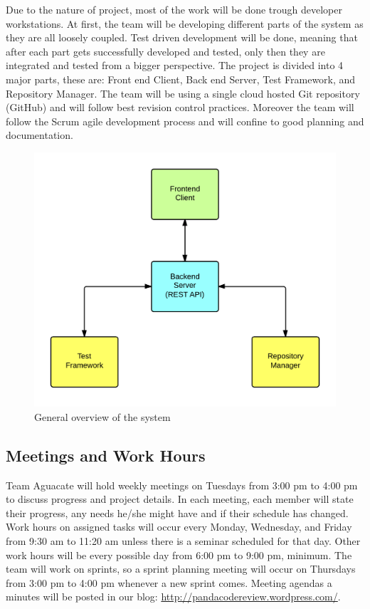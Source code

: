 
Due to the nature of project, most of the work will be done trough developer
workstations. At first, the team will be developing different parts of the
system as they are all loosely coupled. Test driven development will be done,
meaning that after each part gets successfully developed and tested, only then
they are integrated and tested from a bigger perspective. The project is divided
into 4 major parts, these are: Front end Client, Back end Server, Test
Framework, and Repository Manager. The team will be using a single cloud hosted
Git repository (GitHub) and will follow best revision control practices.
Moreover the team will follow the Scrum agile development process and will
confine to good planning and documentation.

\begin{figure}[H]
	\centering
	\includegraphics[width=\textwidth]{img/bigArquitectOverview}
	\caption{General overview of the system}
\end{figure}

\subsection{Meetings and Work Hours}

Team Aguacate will hold weekly meetings on Tuesdays from 3:00 pm to 4:00 pm to
discuss progress and project details. In each meeting, each member will state
their progress, any needs he/she might have and if their schedule has changed.
Work hours on assigned tasks will occur every Monday, Wednesday, and Friday from
9:30 am to 11:20 am unless there is a seminar scheduled for that day. Other work
hours will be every possible day from 6:00 pm to 9:00 pm, minimum. The team will
work on sprints, so a sprint planning meeting will occur on Thursdays from 3:00
pm to 4:00 pm whenever a new sprint comes.  Meeting agendas a minutes will be
posted in our blog: \url{http://pandacodereview.wordpress.com/}.

